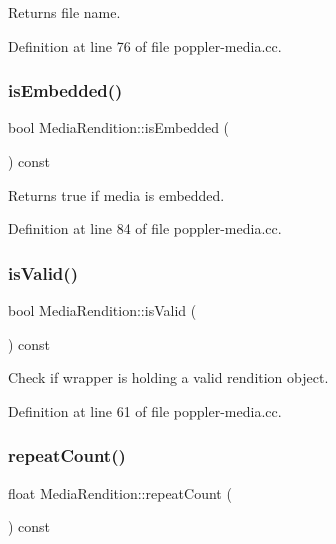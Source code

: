 Returns file name. 

Definition at line 76 of file poppler-\/media.\+cc.

\mbox{\label{class_poppler_1_1_media_rendition_a3719041146c801a028b9a8eafbd1b073}} 
\subsubsection{\texorpdfstring{is\+Embedded()}{isEmbedded()}}
{\footnotesize\ttfamily bool Media\+Rendition\+::is\+Embedded (\begin{DoxyParamCaption}{ }\end{DoxyParamCaption}) const}

Returns true if media is embedded. 

Definition at line 84 of file poppler-\/media.\+cc.

\mbox{\label{class_poppler_1_1_media_rendition_a12fb03b5ff9738d1ccd846bfd0c1d01e}} 
\subsubsection{\texorpdfstring{is\+Valid()}{isValid()}}
{\footnotesize\ttfamily bool Media\+Rendition\+::is\+Valid (\begin{DoxyParamCaption}{ }\end{DoxyParamCaption}) const}

Check if wrapper is holding a valid rendition object. 

Definition at line 61 of file poppler-\/media.\+cc.

\mbox{\label{class_poppler_1_1_media_rendition_af6e8f3ab18c80dd4509e24dc5b049663}} 
\subsubsection{\texorpdfstring{repeat\+Count()}{repeatCount()}}
{\footnotesize\ttfamily float Media\+Rendition\+::repeat\+Count (\begin{DoxyParamCaption}{ }\end{DoxyParamCaption}) const}

